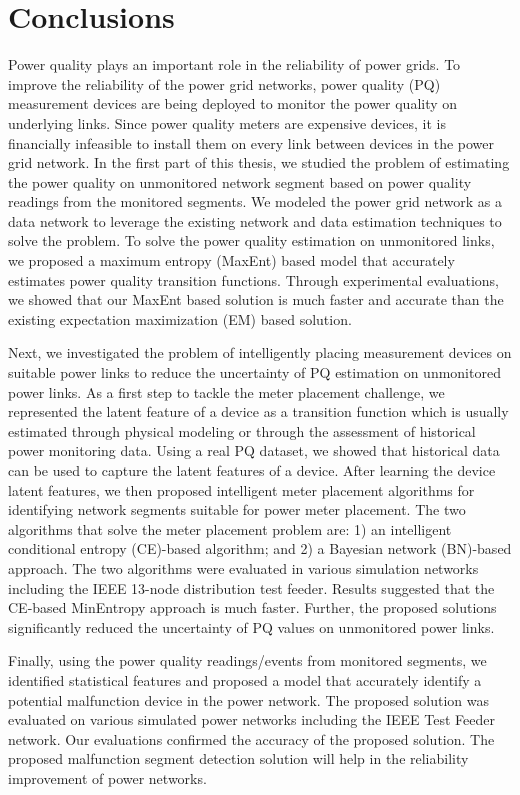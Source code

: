 \label{chap:conclusion}
\section{Conclusions}
Power quality plays an important role in the reliability of power grids. To improve the reliability of the power grid networks, power quality (PQ) measurement devices are being deployed to monitor the power quality on underlying links. Since power quality meters are expensive devices, it is financially infeasible to install them on every link between devices in the power grid network. In the first part of this thesis, we studied the problem of estimating the power quality on unmonitored network segment based on power quality readings from the monitored segments. We modeled the power grid network as a data network to leverage the existing network and data estimation techniques to solve the problem. To solve the power quality estimation on unmonitored links,  we proposed a maximum entropy (MaxEnt) based model that accurately estimates power quality transition functions. Through experimental evaluations, we showed that our MaxEnt based solution is much faster and accurate than the existing expectation maximization (EM) based solution.

Next, we investigated the problem of intelligently placing measurement devices on suitable power links to reduce the uncertainty of PQ estimation on unmonitored power links. As a first step to tackle the meter placement challenge, we represented the latent feature of a device as a transition function which is usually estimated through physical modeling or through the assessment of historical power monitoring data. Using a real PQ dataset, we showed that historical data can be used to capture the latent features of a device. After learning the device latent features, we then proposed intelligent meter placement algorithms for identifying network segments suitable for power meter placement. The two algorithms that solve the meter placement problem are: 1)  an intelligent conditional entropy (CE)-based algorithm; and 2) a Bayesian network (BN)-based approach. The two algorithms were evaluated in various simulation networks including the IEEE 13-node distribution test feeder. Results suggested that the CE-based MinEntropy approach is much faster. Further, the proposed solutions significantly reduced the uncertainty of PQ values on unmonitored power links.

Finally, using the power quality readings/events from monitored segments, we identified statistical features and proposed a model that accurately identify a potential malfunction device in the power network. The proposed solution was evaluated on various simulated power networks including the IEEE Test Feeder network. Our evaluations confirmed the accuracy of the proposed solution. The proposed malfunction segment detection solution will help in the reliability improvement of power networks.

